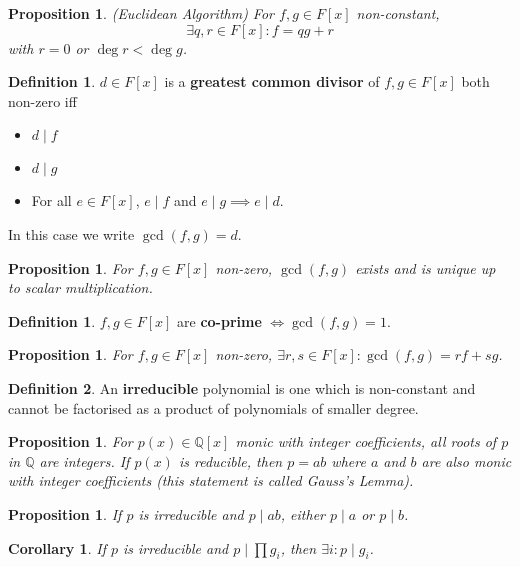 \documentclass[12pt]{article}
\newtheorem{cor}[thm]{Corollary}
\newtheorem{prop}[thm]{Proposition}
\theoremstyle{definition}
\newtheorem{defn}{Definition}[section]
\newtheorem*{defn*}{Definition}
\begin{document}
\begin{prop}
	(Euclidean Algorithm)
	For $f, g \in F[x]$ non-constant,
	$$\exists q, r \in F[x] : f = qg + r$$
	with $r = 0$ or $\deg{r} < \deg{g}$.
\end{prop}

\begin{defn}
	$d \in F[x]$ is a \textbf{greatest common divisor} of $f, g \in F[x]$ both non-zero iff
	\begin{itemize}
		\item $d \mid f$
		\item $d \mid g$
		\item For all $e \in F[x]$, $e \mid f$ and $e \mid g \implies e \mid d$.
	\end{itemize}
	In this case we write $\gcd{(f, g)} = d$.
\end{defn}

\begin{prop}
	For $f, g \in F[x]$ non-zero, $\gcd{(f, g)}$ exists and is unique up to scalar multiplication.
\end{prop}

\begin{defn*}
	$f, g \in F[x]$ are \textbf{co-prime} $\iff \gcd{(f, g)} = 1$.
\end{defn*}

\begin{prop}
	For $f, g \in F[x]$ non-zero, $\exists r, s \in F[x] : \gcd{(f, g)} = rf + sg$.
\end{prop}

\begin{defn*}
	An \textbf{irreducible} polynomial is one which is non-constant and cannot be factorised as a product of polynomials of smaller degree.
\end{defn*}

\begin{prop}
	For $p(x) \in \mathbb{Q}[x]$ monic with integer coefficients, all roots of $p$ in $\mathbb{Q}$ are integers.
	If $p(x)$ is reducible, then $p = ab$ where $a$ and $b$ are also monic with integer coefficients (this statement is called Gauss's Lemma).
\end{prop}

\begin{prop}
	If $p$ is irreducible and $p \mid ab$, either $p \mid a$ or $p \mid b$.
\end{prop}

\begin{cor}
	If $p$ is irreducible and $p \mid \prod g_i$, then $\exists i : p \mid g_i$.
\end{cor}
\end{document}
